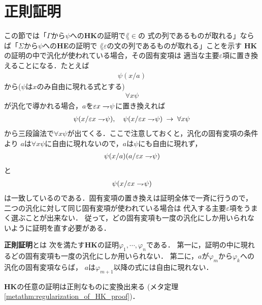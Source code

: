 \section{正則証明}
\label{sec:regular_proof}
	この節では「$\Gamma$から$\psi$への{\bf HK}の証明で$\lang{\in}$の
	式の列であるものが取れる」ならば「$\Sigma$から$\psi$への{\bf HE}の証明で
	$\lang{\varepsilon}$の文の列であるものが取れる」ことを示す
	{\bf HK}の証明の中で汎化が使われている場合，その固有変項は
	適当な主要$\varepsilon$項に置き換えることになる．たとえば
	\begin{align}
		\psi(x/a)
	\end{align}
	から($\psi$は$x$のみ自由に現れる式とする)
	\begin{align}
		\forall x \psi
	\end{align}
	が汎化で導かれる場合，$a$を$\varepsilon x \rightharpoondown\hspace{-0.25em} \psi$に置き換えれば
	\begin{align}
		\psi(x/\varepsilon x \rightharpoondown\hspace{-0.25em} \psi), 
		\quad \psi(x/\varepsilon x \rightharpoondown\hspace{-0.25em} \psi) \hspace{0.25em}\rightarrow\hspace{0.25em} \forall x \psi
	\end{align}
	から三段論法で$\forall x \psi$が出てくる．ここで注意しておくと，汎化の固有変項の条件より
	$a$は$\forall x \psi$に自由に現れないので，$a$は$\psi$にも自由に現れず，
	\begin{align}
		\psi(x/a)(a/\varepsilon x \rightharpoondown\hspace{-0.25em} \psi)
	\end{align}
	と
	\begin{align}
		\psi(x/\varepsilon x \rightharpoondown\hspace{-0.25em} \psi)
	\end{align}
	は一致しているのである．固有変項の置き換えは証明全体で一斉に行うので，
	二つの汎化に対して同じ固有変項が使われている場合は
	代入する主要$\varepsilon$項をうまく選ぶことが出来ない．
	従って，どの固有変項も一度の汎化にしか用いられないように証明を直す必要がある．
	
	\begin{screen}
		\begin{metadfn}[正則証明]
			{\bf 正則証明}とは
			次を満たす{\bf HK}の証明$\varphi_{1},\cdots,\varphi_{n}$である．
			第一に，証明の中に現れるどの固有変項も一度の汎化にしか用いられない．
			第二に，$a$が$\varphi_{m}$から$\varphi_{k}$への汎化の固有変項ならば，
			$a$は$\varphi_{m+1}$以降の式には自由に現れない．
		\end{metadfn}
	\end{screen}
	
	{\bf HK}の任意の証明は正則なものに変換出来る
	(メタ定理\ref{metathm:regularization_of_HK_proof})．
	
